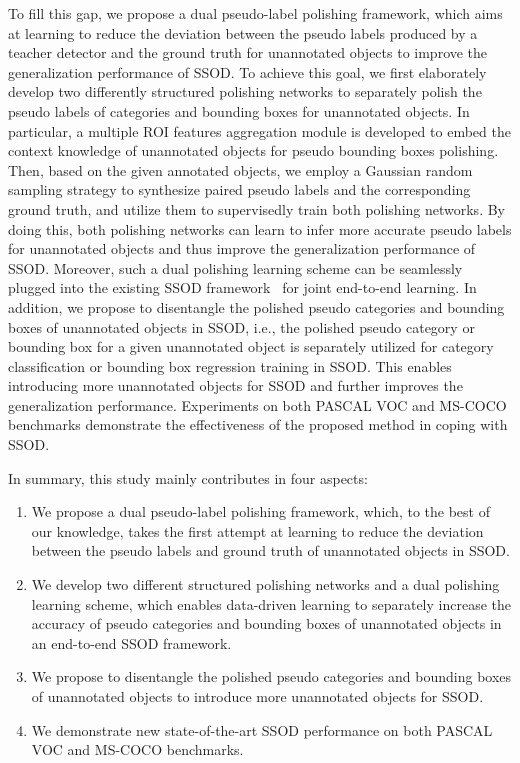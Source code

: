 \documentclass[letterpaper]{article} \usepackage{aaai23}  \usepackage{times}  \usepackage{helvet}  \usepackage{courier}  \usepackage[hyphens]{url}  \usepackage{graphicx} \urlstyle{rm} \def\UrlFont{\rm}  \usepackage{natbib}  \usepackage{caption} \frenchspacing  \setlength{\pdfpagewidth}{8.5in}  \setlength{\pdfpageheight}{11in}  \usepackage{algorithm}
\begin{document}
To fill this gap, we propose a dual pseudo-label polishing framework, which aims at learning to reduce the deviation between the pseudo labels produced by a teacher detector and the ground truth for unannotated objects to improve the generalization performance of SSOD. To achieve this goal, we first elaborately develop two differently structured polishing networks to separately polish the pseudo labels of categories and bounding boxes for unannotated objects. In particular, a multiple ROI features aggregation module is developed to embed the context knowledge of unannotated objects 
for pseudo bounding boxes polishing. Then, based on the given annotated objects, we employ a Gaussian random sampling strategy to synthesize paired pseudo labels 
and the corresponding ground truth, and utilize them to supervisedly train both polishing networks. By doing this, both polishing networks can learn to infer more accurate pseudo labels for unannotated objects and thus improve the generalization performance of SSOD. Moreover, such a dual polishing learning scheme can be seamlessly plugged into the existing SSOD framework~\cite{xu2021end} for joint end-to-end learning. In addition, we propose to disentangle the polished pseudo categories and bounding boxes of unannotated objects in SSOD, i.e., the polished pseudo category or bounding box for a given unannotated object is separately utilized for category classification or bounding box regression training in SSOD. This enables introducing more unannotated objects for SSOD and further improves the generalization performance. Experiments on both PASCAL VOC and MS-COCO benchmarks demonstrate the effectiveness of the proposed method in coping with SSOD.

In summary, this study mainly contributes in four aspects:
\begin{enumerate}
    \item We propose a dual pseudo-label polishing framework, which, to the best of our knowledge, takes the first attempt at learning to reduce the deviation between the pseudo labels and ground truth of unannotated objects in SSOD.
    \item We develop two different structured polishing networks and a dual polishing learning scheme, which enables data-driven learning to separately increase the accuracy of pseudo categories and bounding boxes of unannotated objects in an end-to-end SSOD framework.
    \item We propose to disentangle the polished pseudo categories and bounding boxes of unannotated objects to introduce more unannotated objects for SSOD. 
    \item We demonstrate new state-of-the-art SSOD performance on both PASCAL VOC and MS-COCO benchmarks. 
\end{enumerate}
\end{document}
